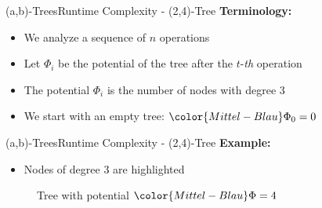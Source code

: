 
\begin{frame}{(a,b)-Trees}{Runtime Complexity - (2,4)-Tree}
  \textbf{Terminology:}
  \begin{itemize}
    \item<2->
      We analyze a sequence of {\color{Mittel-Blau}$n$} operations
    \item<3->
      Let {\color{Mittel-Blau}$\Phi_i$} be the potential of the tree after
      the {\color{Mittel-Blau}$t$}-\textit{th} operation
    \item<4->
      The potential {\color{Mittel-Blau}$\Phi_i$} is the number of nodes
      with {\color{Mittel-Blau}degree 3}
    \item<5->
      We start with an empty tree: ${\color{Mittel-Blau}\Phi_0} = 0$
  \end{itemize}
\end{frame}


\begin{frame}{(a,b)-Trees}{Runtime Complexity - (2,4)-Tree}
  \textbf{Example:}
  \begin{itemize}
    \item<2->
      Nodes of {\color{Mittel-Blau}degree 3} are highlighted
  \end{itemize}
  \begin{figure}[!h]
    \begin{adjustbox}{width=0.8\linewidth}
      
    \end{adjustbox}
    \caption{Tree with potential ${\color{Mittel-Blau}\Phi} = 4$}
    \label{fig:a_b_tree:potential_introduction}
  \end{figure}
\end{frame}


